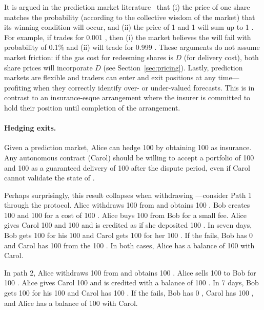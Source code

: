 It is argued in the prediction market literature~\cite{clark2014decentralizing} that (i) the price of one share matches the probability (according to the collective wisdom of the market) that its winning condition will occur, and (ii) the price of 1 \final and 1 \fail will sum up to 1 \ethone. For example, if \fail trades for 0.001 \ethone, then (i) the market believes the \rblock will fail with probability of 0.1\% and (ii) \final will trade for  0.999 \ethone. These arguments do not assume market friction: if the gas cost for redeeming shares is $D$ (for delivery cost), both share prices will incorporate $D$ (see Section~\ref{sec:pricing}). Lastly, prediction markets are flexible and traders can enter and exit positions at any time---profiting when they correctly identify over- or under-valued forecasts. This is in contrast to an insurance-esque arrangement where the insurer is committed to hold their position until completion of the arrangement.





\paragraph*{Hedging exits.} Given a prediction market, Alice can hedge 100 \ethxx by obtaining 100 \fail as insurance. Any autonomous \layerone contract (Carol) should be willing to accept a portfolio of 100 \ethxx and 100 \fail as a guaranteed delivery of 100 \ethone after the dispute period, even if Carol cannot validate the state of \layertwo.  

Perhaps surprisingly, this result collapses when withdrawing \ethtwo---consider Path 1 through the protocol. Alice withdraws 100 \ethtwo from \layertwo and obtains 100 \ethxx. Bob creates 100 \fail and 100 \final for a cost of 100 \ethone. Alice buys 100 \fail from Bob for a small fee. Alice gives Carol 100 \ethxx and 100 \fail and is credited as if she deposited 100 \ethone. In seven days, Bob gets 100 \ethone for his 100 \final and Carol gets 100 \ethone for her 100 \ethxx. If the \rblock fails, Bob has 0 \ethone and Carol has 100 \ethone from the 100 \fail. In both cases, Alice has a balance of 100 \ethone with Carol. 

In path 2, Alice withdraws 100 \ethtwo from \layertwo and obtains 100 \ethxx. Alice sells 100 \ethxx to Bob for 100 \ethone. Alice gives Carol 100 \ethone and is credited with a balance of 100 \ethone. In 7 days, Bob gets 100 \ethone for his 100 \ethxx and Carol has 100 \ethone. If the \rblock fails, Bob has 0 \ethone, Carol has 100 \ethone, and Alice has a balance of 100 \ethone with Carol.

